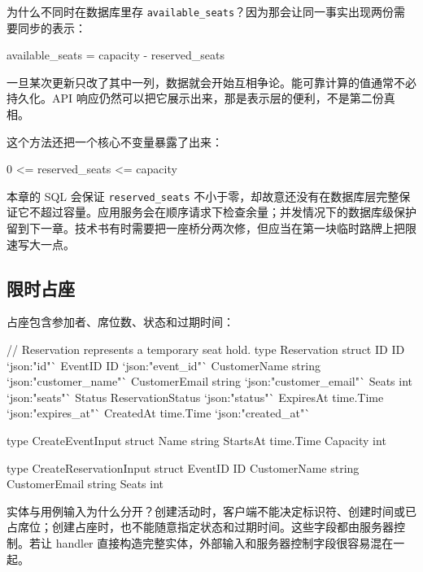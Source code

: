 为什么不同时在数据库里存 \texttt{available\_seats}？因为那会让同一事实出现两份需要同步的表示：

\begin{plaincode}[]
available_seats = capacity - reserved_seats
\end{plaincode}

一旦某次更新只改了其中一列，数据就会开始互相争论。能可靠计算的值通常不必持久化。API 响应仍然可以把它展示出来，那是表示层的便利，不是第二份真相。

这个方法还把一个核心不变量暴露了出来：

\begin{plaincode}[]
0 <= reserved_seats <= capacity
\end{plaincode}

本章的 SQL 会保证 \texttt{reserved\_seats} 不小于零，却故意还没有在数据库层完整保证它不超过容量。应用服务会在顺序请求下检查余量；并发情况下的数据库级保护留到下一章。技术书有时需要把一座桥分两次修，但应当在第一块临时路牌上把限速写大一点。

\subsection{限时占座}

占座包含参加者、席位数、状态和过期时间：

\begin{gocode}[title={代码清单 12.8 \texttt{domain.go}：占座实体与用例输入}]
// Reservation represents a temporary seat hold.
type Reservation struct {
    ID            ID                `json:"id"`
    EventID       ID                `json:"event_id"`
    CustomerName  string            `json:"customer_name"`
    CustomerEmail string            `json:"customer_email"`
    Seats         int               `json:"seats"`
    Status        ReservationStatus `json:"status"`
    ExpiresAt     time.Time         `json:"expires_at"`
    CreatedAt     time.Time         `json:"created_at"`
}

type CreateEventInput struct {
    Name     string
    StartsAt time.Time
    Capacity int
}

type CreateReservationInput struct {
    EventID       ID
    CustomerName  string
    CustomerEmail string
    Seats         int
}
\end{gocode}

实体与用例输入为什么分开？创建活动时，客户端不能决定标识符、创建时间或已占席位；创建占座时，也不能随意指定状态和过期时间。这些字段都由服务器控制。若让 handler 直接构造完整实体，外部输入和服务器控制字段很容易混在一起。

